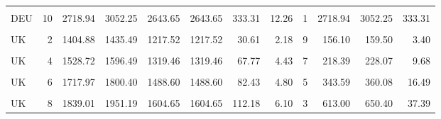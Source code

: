 \begin{table}[!h]
{\begin{tabular}[t]{lrrrrrrrrrrr}
\cellcolor{gray!10}{DEU} & \cellcolor{gray!10}{9} & \cellcolor{gray!10}{2606.76} & \cellcolor{gray!10}{2953.97} & \cellcolor{gray!10}{2534.76} & \cellcolor{gray!10}{2534.76} & \cellcolor{gray!10}{347.21} & \cellcolor{gray!10}{13.32} & \cellcolor{gray!10}{2} & \cellcolor{gray!10}{1303.38} & \cellcolor{gray!10}{1476.98} & \cellcolor{gray!10}{173.60}\\
DEU & 10 & 2718.94 & 3052.25 & 2643.65 & 2643.65 & 333.31 & 12.26 & 1 & 2718.94 & 3052.25 & 333.31\\
\addlinespace
\cellcolor{gray!10}{UK} & \cellcolor{gray!10}{1} & \cellcolor{gray!10}{1255.31} & \cellcolor{gray!10}{1294.73} & \cellcolor{gray!10}{1066.81} & \cellcolor{gray!10}{1066.81} & \cellcolor{gray!10}{39.42} & \cellcolor{gray!10}{3.14} & \cellcolor{gray!10}{10} & \cellcolor{gray!10}{125.53} & \cellcolor{gray!10}{129.47} & \cellcolor{gray!10}{3.94}\\
UK & 2 & 1404.88 & 1435.49 & 1217.52 & 1217.52 & 30.61 & 2.18 & 9 & 156.10 & 159.50 & 3.40\\
\cellcolor{gray!10}{UK} & \cellcolor{gray!10}{3} & \cellcolor{gray!10}{1415.83} & \cellcolor{gray!10}{1494.52} & \cellcolor{gray!10}{1206.99} & \cellcolor{gray!10}{1206.99} & \cellcolor{gray!10}{78.69} & \cellcolor{gray!10}{5.56} & \cellcolor{gray!10}{8} & \cellcolor{gray!10}{176.98} & \cellcolor{gray!10}{186.82} & \cellcolor{gray!10}{9.84}\\
UK & 4 & 1528.72 & 1596.49 & 1319.46 & 1319.46 & 67.77 & 4.43 & 7 & 218.39 & 228.07 & 9.68\\
\cellcolor{gray!10}{UK} & \cellcolor{gray!10}{5} & \cellcolor{gray!10}{1576.07} & \cellcolor{gray!10}{1670.52} & \cellcolor{gray!10}{1348.37} & \cellcolor{gray!10}{1348.37} & \cellcolor{gray!10}{94.46} & \cellcolor{gray!10}{5.99} & \cellcolor{gray!10}{6} & \cellcolor{gray!10}{262.68} & \cellcolor{gray!10}{278.42} & \cellcolor{gray!10}{15.74}\\
\addlinespace
UK & 6 & 1717.97 & 1800.40 & 1488.60 & 1488.60 & 82.43 & 4.80 & 5 & 343.59 & 360.08 & 16.49\\
\cellcolor{gray!10}{UK} & \cellcolor{gray!10}{7} & \cellcolor{gray!10}{1823.06} & \cellcolor{gray!10}{1935.16} & \cellcolor{gray!10}{1588.86} & \cellcolor{gray!10}{1588.86} & \cellcolor{gray!10}{112.10} & \cellcolor{gray!10}{6.15} & \cellcolor{gray!10}{4} & \cellcolor{gray!10}{455.77} & \cellcolor{gray!10}{483.79} & \cellcolor{gray!10}{28.02}\\
UK & 8 & 1839.01 & 1951.19 & 1604.65 & 1604.65 & 112.18 & 6.10 & 3 & 613.00 & 650.40 & 37.39\\

\end{tabular}}
\end{table}
